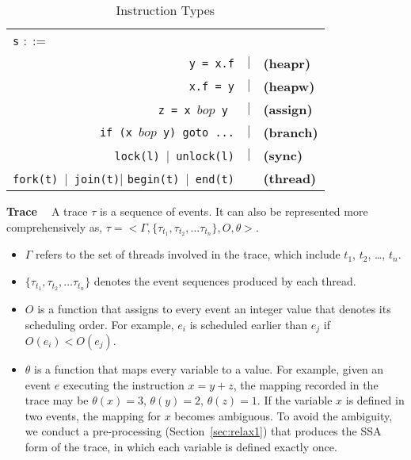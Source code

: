 \begin{table}
	\begin{center}
		\begin{tabular}{rcl}
			\multicolumn{1}{l}{{\tt s} $::=$} & & \\
			{\tt y = x.f} & $|$ & {\bf (heapr)} \\ 
			{\tt x.f = y}  & $|$ & {\bf (heapw)} \\ %
			{\tt z = x $bop$ y}\  & $|$ & {\bf (assign)} \\ %
			{\tt if (x $bop$  y) goto ...} & $|$ &  {\bf (branch)} \\
			{\tt lock(l)}\ $|$\ {\tt unlock(l)}  & $|$& {\bf (sync)} \\
			{\tt fork(t)}\ $|$\ {\tt join(t)}$|$ {\tt begin(t)}\ $|$\ {\tt end(t)} &  & {\bf (thread)}
		\end{tabular}
	\end{center}
	\caption{\label{Ta:syntax}Instruction Types}
\end{table}


{\bf Trace \ } A trace $\tau$ is a sequence of events. It can also be represented more comprehensively as,  $\tau=<\Gamma , \{\tau_{t_1}, \tau_{t_2}, \dots \tau_{t_n} \}, O, \theta>$.
\begin{itemize}
\item  $\Gamma$ refers to the set of threads involved in the trace, which include $t_1$, $t_2$, \dots, $t_n$.
\item   $\{\tau_{t_1}, \tau_{t_2}, \dots \tau_{t_n} \}$ denotes the event sequences produced by each thread.  
\item  $O$ is a function that assigns  to every event an integer value that denotes its scheduling order. For example, $e_i$ is scheduled earlier than $e_j$ if $O(e_i)<O(e_j)$.
\item  $\theta$ is a function that maps every variable to a value. For example, given an event $e$ executing the instruction $x=y+z$, the mapping recorded in the trace may be $\theta(x)=3$,  $\theta(y)=2$,  $\theta(z)=1$.  If the variable $x$ is defined in two events, the mapping for $x$ becomes ambiguous. To avoid the ambiguity, we conduct a pre-processing  (Section~\ref{sec:relax1}) that produces the SSA form of the trace, in which each variable is defined exactly once. 
\end{itemize}



